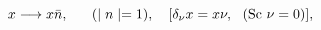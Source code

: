 \begin{equation}
x \longrightarrow x \bar{n},~~~~~(\mid n\mid=1),~~~[\delta_{\nu} x = x \nu, ~~({\rm Sc}~\nu = 0)],
\end{equation}

